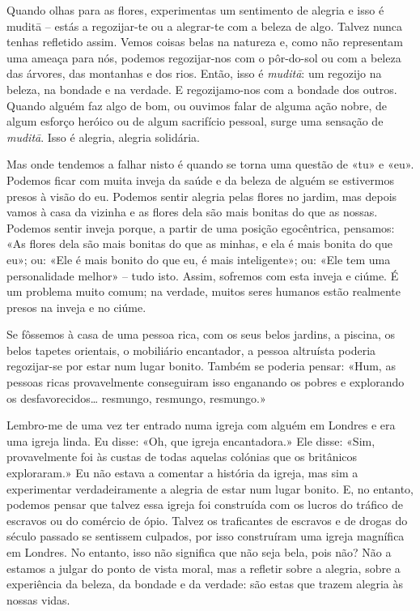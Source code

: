 Quando olhas para as flores, experimentas um sentimento de alegria e isso é
muditā -- estás a regozijar-te ou a alegrar-te com a beleza de algo. Talvez
nunca tenhas refletido assim. Vemos coisas belas na natureza e, como não
representam uma ameaça para nós, podemos regozijar-nos com o pôr-do-sol ou com
a beleza das árvores, das montanhas e dos rios. Então, isso é \emph{muditā}: um
regozijo na beleza, na bondade e na verdade. E regozijamo-nos com a bondade dos
outros. Quando alguém faz algo de bom, ou ouvimos falar de alguma ação nobre, de
algum esforço heróico ou de algum sacrifício pessoal, surge uma sensação de
\emph{muditā}. Isso é alegria, alegria solidária.

Mas onde tendemos a falhar nisto é quando se torna uma questão de «tu» e «eu».
Podemos ficar com muita inveja da saúde e da beleza de alguém se estivermos
presos à visão do eu. Podemos sentir alegria pelas flores no jardim, mas depois
vamos à casa da vizinha e as flores dela são mais bonitas do que as nossas.
Podemos sentir inveja porque, a partir de uma posição egocêntrica, pensamos: «As
flores dela são mais bonitas do que as minhas, e ela é mais bonita do que eu»;
ou: «Ele é mais bonito do que eu, é mais inteligente»; ou: «Ele tem uma
personalidade melhor» -- tudo isto. Assim, sofremos com esta inveja e ciúme. É
um problema muito comum; na verdade, muitos seres humanos estão realmente presos
na inveja e no ciúme.

Se fôssemos à casa de uma pessoa rica, com os seus belos jardins, a piscina, os
belos tapetes orientais, o mobiliário encantador, a pessoa altruísta poderia
regozijar-se por estar num lugar bonito. Também se poderia pensar: «Hum, as
pessoas ricas provavelmente conseguiram isso enganando os pobres e explorando os
desfavorecidos\ldots{} resmungo, resmungo, resmungo.»

Lembro-me de uma vez ter entrado numa igreja com alguém em Londres e era uma
igreja linda. Eu disse: «Oh, que igreja encantadora.» Ele disse: «Sim,
provavelmente foi às custas de todas aquelas colónias que os britânicos
exploraram.» Eu não estava a comentar a história da igreja, mas sim a
experimentar verdadeiramente a alegria de estar num lugar bonito. E, no entanto,
podemos pensar que talvez essa igreja foi construída com os lucros do tráfico de
escravos ou do comércio de ópio. Talvez os traficantes de escravos e de drogas
do século passado se sentissem culpados, por isso construíram uma igreja
magnífica em Londres. No entanto, isso não significa que não seja bela, pois
não? Não a estamos a julgar do ponto de vista moral, mas a refletir sobre a
alegria, sobre a experiência da beleza, da bondade e da verdade: são estas que
trazem alegria às nossas vidas.


